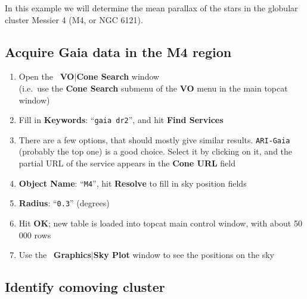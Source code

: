 \documentclass{article}
\newcommand{\buttimg}[1]
           {\mbox{\vtop{\vskip-2ex\hbox{\texttt{[image: \#1]}}}}}
\newcommand{\winfig}[2]
           {\vspace*{-0.5cm}
            \hspace*{0.5cm}\mbox{\vtop{\hbox{\texttt{[image: \#2]}}}}}
\newcommand{\lab}[1]{{\bf #1}}
\newcommand{\mb}[3]{\buttimg{#1}~\lab{#2}$\mid$\lab{#3}}
\newcommand{\entry}[2]{\lab{#1}: ``{\tt #2}''}
\begin{document}
\begin{minipage}[t]{11cm}
In this example we will determine the mean parallax of
the stars in the globular cluster Messier 4 (M4, or NGC 6121).

\subsection{Acquire Gaia data in the M4 region}
\label{sec:m4-cone}

  \raggedright
  \begin{enumerate}
  \item Open the \mb{CONE_DIALOG.png}{VO}{Cone Search} window \\
        (i.e.\ use the \lab{Cone Search} submenu of the \lab{VO} menu
         in the main topcat window)
  \item Fill in \entry{Keywords}{gaia dr2}, and hit \lab{Find Services}
  \item There are a few options, that should mostly give similar results.
        {\tt ARI-Gaia} (probably the top one) is a good choice.
        Select it by clicking on it, and the
        partial URL of the service appears in the \lab{Cone URL} field
  \item \entry{Object Name}{M4}, hit \lab{Resolve} to fill in
        sky position fields
  \item \entry{Radius}{0.3} (degrees)
  \item Hit \lab{OK};
        new table is loaded into topcat main control window,
        with about 50\,000 rows
  \item Use the \mb{skyplot_button.png}{Graphics}{Sky Plot} window
        to see the positions on the sky
  \end{enumerate}
\end{minipage}
\begin{minipage}[t]{8cm}
  \winfig{width=8cm}{m4_cone.png}
\end{minipage}

\subsection{Identify comoving cluster}
\label{sec:blob}
\end{document}
